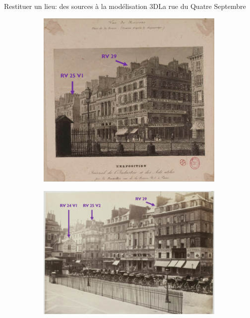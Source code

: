 \documentclass[8pt]{beamer}
\begin{document}
\begin{frame}{Restituer un lieu: des sources à la modélisation 3D}{La rue du Quatre Septembre}
	\begin{figure}
		\begin{subfigure}{0.48\textwidth}
			\includegraphics[width=\textwidth]{includes/c_slide7_0.png}
		\end{subfigure}
		\begin{subfigure}{0.48\textwidth}
			\includegraphics[width=\textwidth]{includes/c_slide7_1.png}
		\end{subfigure}

\end{figure}
\end{frame}
\end{document}
